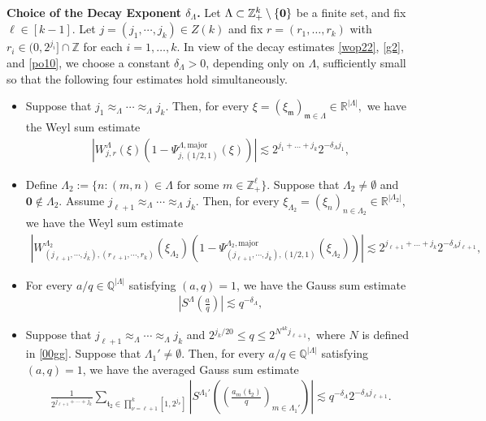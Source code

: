 \documentclass[11 pt,letterpaper]{amsart}
\theoremstyle{plain}
\theoremstyle{definition}
\theoremstyle{remark} \theoremstyle{exam} \theoremstyle{ob}
\numberwithin{equation}{section}
\begin{document}
 
\noindent\textbf{Choice of the Decay Exponent $\delta_{\Lambda}$.}
	Let $\Lambda\subset \mathbb{Z}_+^k \setminus \{{\bf 0}\}$ be a finite set, and fix $ \ell \in  [k-1]$.    Let $j=(j_1,\cdots,j_k) \in Z(k) $ and  fix $r = (r_1, \dots, r_k)$ with $r_i \in (0, 2^{j_i}] \cap \mathbb{Z}$ for each $i = 1, \dots, k$. In view of the decay estimates \eqref{wop22}, \eqref{g2}, and \eqref{po10}, we choose a constant $\delta_{\Lambda}>0$, depending only on $\Lambda$, sufficiently small so that the following four estimates hold simultaneously.
	\begin{itemize}
		\item[(1)] Suppose that $j_1 \approx_{\Lambda} \cdots \approx_{\Lambda} j_k.$ Then, for every $\xi=(\xi_{\mathfrak{m}})_{\mathfrak{m}\in\Lambda} \in \mathbb{R}^{|\Lambda|},$ we have the Weyl sum estimate \begin{align}\label{weyl}
			\left| W_{j,r}^{\Lambda}(\xi) \left( 1 - \Psi_{j,(1/2,1)}^{\Lambda,\mathrm{major}}(\xi) \right) \right| \lesssim 2^{j_1 + \dots + j_k} 2^{-\delta_{\Lambda} j_1},
		\end{align}
		\item[(2)] Define $\Lambda_{2}:=\{n: (m,n)\in \Lambda\text{ for some } m\in\mathbb{Z}_{+}^{\ell}\}.$  Suppose that $\Lambda_2\neq \emptyset$ and $\textbf{0}\notin \Lambda_2.$ Assume  $j_{\ell+1} \approx_{\Lambda} \cdots \approx_{\Lambda} j_k.$  Then, for every $\xi_{\Lambda_2}=(\xi_{n})_{n\in\Lambda_2} \in \mathbb{R}^{|\Lambda_2|},$ we have the Weyl sum estimate \begin{align}\label{weyl1}
			\left| W_{(j_{\ell+1},\cdots,j_{k}),(r_{\ell+1},\cdots,r_{k})}^{\Lambda_2}(\xi_{\Lambda_2}) \left( 1 - \Psi_{(j_{\ell+1},\cdots,j_{k}),(1/2,1)}^{\Lambda_2,\mathrm{major}}(\xi_{\Lambda_2}) \right) \right| \lesssim 2^{j_{\ell+1} + \dots + j_k} 2^{-\delta_{\Lambda} j_{\ell+1}},
		\end{align}
		\item[(3)] For every $a/q\in\mathbb{Q}^{|\Lambda|}$ satisfying $(a,q)=1$, we have the Gauss sum estimate \begin{align}\label{gaus}
			\left|S^{\Lambda}\!\left(\frac{a}{q}\right)\right|
			\lesssim q^{-\delta_{\Lambda}},
		\end{align}
		\item[(4)] Suppose that $j_{\ell+1} \approx_{\Lambda} \cdots \approx_{\Lambda} j_k$ and $ 2^{j_k/20} \le q \le 2^{N^{4k}j_{\ell+1}},$ where $N$  is defined in \eqref{00gg}. Suppose that $\Lambda_1'\neq \emptyset$. Then, for every $a/q\in\mathbb{Q}^{|\Lambda|}$ satisfying $(a,q)=1$, we have the averaged Gauss sum estimate \begin{align}\label{aver}
			\frac{1}{ 2^{j_{\ell+1} +\cdots+ j_k}       } \sum_{\mathfrak{t}_2\in \prod_{\nu=\ell+1}^k [1,2^{j_\nu}] }  \left|S^{\Lambda_{1}'}\left(\left( \frac{a_{m}(\mathfrak{t}_2)}{q} \right)_{m\in \Lambda_{1}'}\right) \right|\lesssim q^{-\delta_{\Lambda}}2^{-\delta_{\Lambda} j_{\ell+1}}.
		\end{align}
	\end{itemize}
\end{document}
